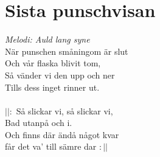 \section{Sista punschvisan}
\textit{Melodi: Auld lang syne}
\vspace{2mm}\\
När punschen småningom är slut\\
Och vår flaska blivit tom,\\
Så vänder vi den upp och ner\\
Tills dess inget rinner ut.\\
\\
$||:$ Så slickar vi, så slickar vi,\\
Bad utanpå och i.\\
Och finns där ändå något kvar\\
får det va' till sämre dar $:||$
